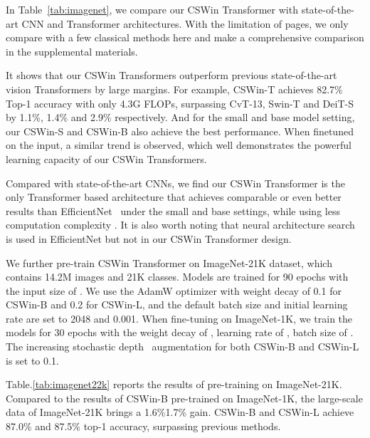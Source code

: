 \documentclass[10pt,twocolumn,letterpaper]{article}
\newcommand{\Tref}[1]{Table~\ref{#1}}
\begin{document}
In \Tref{tab:imagenet}, we compare our CSWin Transformer with state-of-the-art CNN and Transformer architectures. With the limitation of pages, we only compare with a few classical methods here and make a comprehensive comparison in the supplemental materials.

It shows that our CSWin Transformers outperform previous state-of-the-art vision Transformers by large margins. For example, CSWin-T achieves 82.7\% Top-1 accuracy with only 4.3G FLOPs, surpassing CvT-13, Swin-T and DeiT-S by 1.1\%, 1.4\% and 2.9\% respectively. And for the small and base model setting, our CSWin-S and CSWin-B also achieve the best performance. When finetuned on the  input, a similar trend is observed, which well demonstrates the powerful learning capacity of our CSWin Transformers. 

Compared with state-of-the-art CNNs, we find our CSWin Transformer is the only Transformer based architecture that achieves comparable or even better results than EfficientNet~\cite{tan2019efficientnet} under the small and base settings, while using less computation complexity . It is also worth noting that neural architecture search is used in EfficientNet but not in our CSWin Transformer design.


We further pre-train CSWin Transformer on ImageNet-21K dataset, which contains 14.2M images and 21K classes. Models are trained for 90 epochs with the input size of . We use the AdamW optimizer with weight decay of 0.1 for CSWin-B and 0.2 for CSWin-L, and the default batch size and initial learning rate are set to 2048 and 0.001. 
When fine-tuning on ImageNet-1K,  we train the models for 30 epochs with the weight decay of , learning rate of , batch size of . The increasing stochastic depth~\cite{huang2016deep} augmentation for both CSWin-B and CSWin-L is set to 0.1. 

Table.\ref{tab:imagenet22k} reports the results of pre-training on ImageNet-21K. Compared to the results of CSWin-B pre-trained on ImageNet-1K, the large-scale data of ImageNet-21K brings a 1.6\%1.7\% gain. CSWin-B and CSWin-L achieve 87.0\% and 87.5\% top-1 accuracy, surpassing previous methods.
\end{document}
